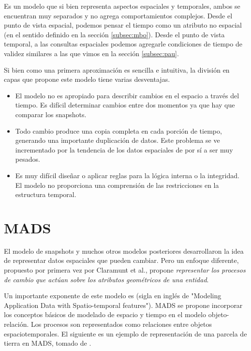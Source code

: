 Es un modelo que si bien representa aspectos espaciales y temporales,
ambos se encuentran muy separados y no agrega comportamientos complejos.
Desde el punto de vista espacial,
podemos pensar el tiempo como un atributo no espacial (en el sentido definido en la sección \ref{subsec:mbo}).
Desde el punto de vista temporal,
a las consultas espaciales podemos agregarle condiciones de tiempo de validez similares a las que vimos en la sección \ref{subsec:pau}.

Si bien como una primera aproximación es sencilla e intuitiva, la división en capas que propone este modelo tiene varias desventajas.
\begin{itemize}
    \item El modelo no es apropiado para describir cambios en el espacio a través del tiempo.
        Es difícil determinar cambios entre dos momentos ya que hay que comparar los snapshots.
    \item Todo cambio produce una copia completa en cada porción de tiempo,
        generando una importante duplicación de datos.
        Este problema se ve incrementado por la tendencia de los datos espaciales de por sí a ser muy pesados.
    \item Es muy difícil diseñar o aplicar reglas para la lógica interna o la integridad.
        El modelo no proporciona una comprensión de las restricciones en la estructura temporal.
\end{itemize}


\section{MADS}

El modelo de snapshots y muchos otros modelos posteriores desarrollaron la idea de representar datos espaciales que pueden cambiar.
Pero un enfoque diferente, propuesto por primera vez por Claramunt et al.\textsuperscript{\cite{CPS98}}, propone \textit{representar los procesos de cambio que actúan sobre los atributos geométricos de una entidad}.

Un importante exponente de este modelo es \textsuperscript{\cite{PSZ99}}
(sigla en inglés de "Modeling Application Data with Spatio-temporal features").
MADS se propone incorporar los conceptos básicos de modelado de espacio y tiempo en el modelo objeto-relación.
Los procesos son representados como relaciones entre objetos espaciotemporales. El siguiente es un ejemplo de representación de una parcela de tierra en MADS, tomado de \cite{sp:litreview}.

